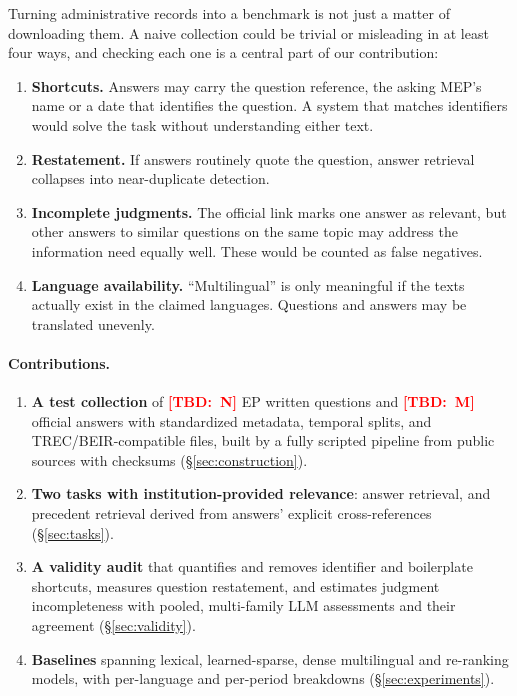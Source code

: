 \documentclass[runningheads]{llncs}
\newcommand{\TBD}[1]{\textcolor{red}{\textbf{[TBD:~#1]}}}
\newcommand{\TBD}[1]{\errmessage{Unresolved TBD: #1}}
\begin{document}
Turning administrative records into a benchmark is not just a matter of
downloading them. A naive collection could be trivial or misleading in at
least four ways, and checking each one is a central part of our
contribution:
\begin{enumerate}
\item \textbf{Shortcuts.} Answers may carry the question reference, the
  asking MEP's name or a date that identifies the question.
  A system that matches identifiers would solve the task without
  understanding either text.
\item \textbf{Restatement.} If answers routinely quote the question, answer
  retrieval collapses into near-duplicate detection.
\item \textbf{Incomplete judgments.} The official link marks one answer as
  relevant, but other answers to similar questions on the same topic may
  address the information need equally well. These would be counted as
  false negatives.
\item \textbf{Language availability.} ``Multilingual'' is only meaningful if
  the texts actually exist in the claimed languages. Questions and answers
  may be translated unevenly.
\end{enumerate}

\paragraph{Contributions.}
\begin{enumerate}
\item[C1] \textbf{A test collection} of \TBD{N} EP written questions and
  \TBD{M} official answers with standardized metadata, temporal splits,
  and TREC/BEIR-compatible files, built by a fully scripted pipeline from
  public sources with checksums (\S\ref{sec:construction}).
\item[C2] \textbf{Two tasks with institution-provided relevance}:
  answer retrieval, and precedent retrieval derived from answers' explicit
  cross-references (\S\ref{sec:tasks}).
\item[C3] \textbf{A validity audit} that quantifies and removes identifier
  and boilerplate shortcuts, measures question restatement, and estimates
  judgment incompleteness with pooled, multi-family LLM assessments and
  their agreement (\S\ref{sec:validity}).
\item[C4] \textbf{Baselines} spanning lexical, learned-sparse, dense
  multilingual and re-ranking models, with per-language and
  per-period breakdowns (\S\ref{sec:experiments}).
\end{enumerate}
\end{document}
